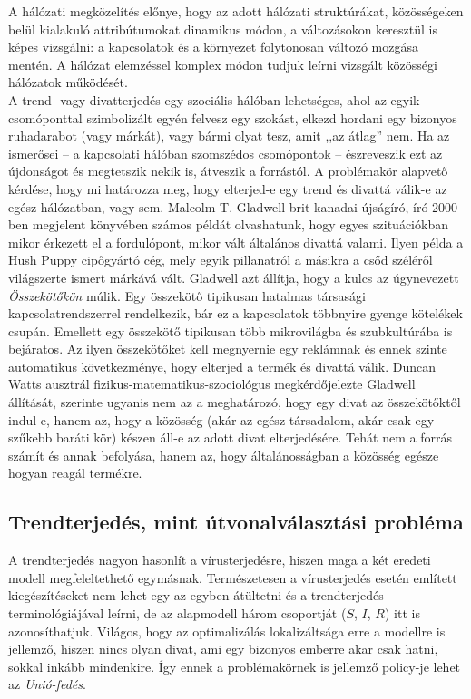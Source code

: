   A hálózati megközelítés előnye, hogy az adott hálózati struktúrákat, közösségeken belül kialakuló attribútumokat dinamikus módon, a változásokon keresztül is képes vizsgálni: a kapcsolatok és a környezet folytonosan változó mozgása mentén. A hálózat elemzéssel komplex módon tudjuk leírni vizsgált közösségi hálózatok működését\cite{Csaba_Pal}.\\

  A trend- vagy divatterjedés egy szociális hálóban lehetséges, ahol az egyik csomóponttal szimbolizált egyén felvesz egy szokást, elkezd hordani egy bizonyos ruhadarabot (vagy márkát), vagy bármi olyat tesz, amit ,,az átlag'' nem. Ha az ismerősei -- a kapcsolati hálóban szomszédos csomópontok -- észreveszik ezt az újdonságot és megtetszik nekik is, átveszik a forrástól. A problémakör alapvető kérdése, hogy mi határozza meg, hogy elterjed-e egy trend és divattá válik-e az egész hálózatban, vagy sem. Malcolm T. Gladwell brit-kanadai újságíró, író 2000-ben megjelent könyvében\cite{The_Tipping_Point} számos példát olvashatunk, hogy egyes szituációkban mikor érkezett el a fordulópont, mikor vált általános divattá valami. Ilyen példa a Hush Puppy cipőgyártó cég, mely egyik pillanatról a másikra a csőd széléről világszerte ismert márkává vált. Gladwell azt állítja, hogy a kulcs az úgynevezett \textit{Összekötőkön} múlik. Egy összekötő tipikusan hatalmas társasági kapcsolatrendszerrel rendelkezik, bár ez a kapcsolatok többnyire gyenge kötelékek csupán. Emellett egy összekötő tipikusan több mikrovilágba és szubkultúrába is bejáratos. Az ilyen összekötőket kell megnyernie egy reklámnak és ennek szinte automatikus következménye, hogy elterjed a termék és divattá válik. Duncan Watts ausztrál fizikus-matematikus-szociológus megkérdőjelezte Gladwell állítását, szerinte ugyanis nem az a meghatározó, hogy egy divat az összekötőktől indul-e, hanem az, hogy a közösség (akár az egész társadalom, akár csak egy szűkebb baráti kör) készen áll-e az adott divat elterjedésére. Tehát nem a forrás számít és annak befolyása, hanem az, hogy általánosságban a közösség egésze hogyan reagál termékre.

    \subsection{Trendterjedés, mint útvonalválasztási probléma}
    A trendterjedés nagyon hasonlít a vírusterjedésre, hiszen maga a két eredeti modell megfeleltethető egymásnak. Természetesen a vírusterjedés esetén említett kiegészítéseket nem lehet egy az egyben átültetni és a trendterjedés terminológiájával leírni, de az alapmodell három csoportját ($S$, $I$, $R$) itt is azonosíthatjuk. Világos, hogy az optimalizálás lokalizáltsága erre a modellre is jellemző, hiszen nincs olyan divat, ami egy bizonyos emberre akar csak hatni, sokkal inkább mindenkire. Így ennek a problémakörnek is jellemző policy-je lehet az \textit{Unió-fedés}.

